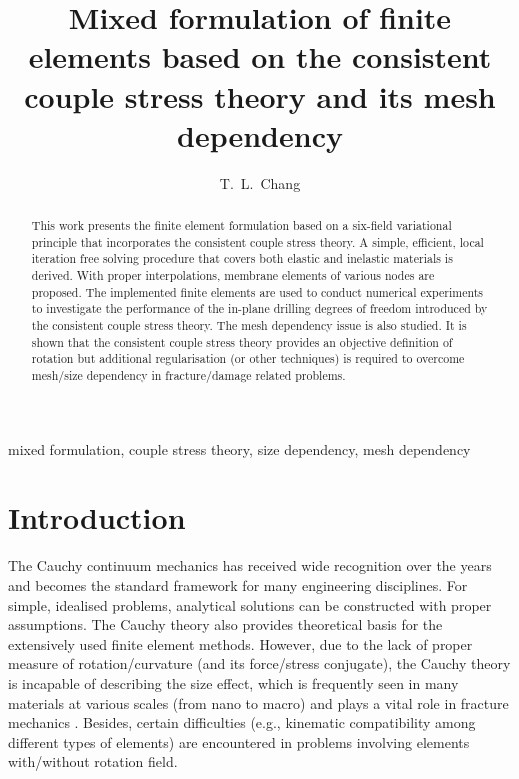 \documentclass[3p,sort&compress,11pt,fleqn]{elsarticle}
\begin{document}
\begin{abstract}
This work presents the finite element formulation based on a six-field variational principle that incorporates the consistent couple stress theory. A simple, efficient, local iteration free solving procedure that covers both elastic and inelastic materials is derived. With proper interpolations, membrane elements of various nodes are proposed. The implemented finite elements are used to conduct numerical experiments to investigate the performance of the in-plane drilling degrees of freedom introduced by the consistent couple stress theory. The mesh dependency issue is also studied. It is shown that the consistent couple stress theory provides an objective definition of rotation but additional regularisation (or other techniques) is required to overcome mesh/size dependency in fracture/damage related problems.
\end{abstract}
\begin{keyword}
mixed formulation\sep
couple stress theory\sep
size dependency\sep
mesh dependency
\end{keyword}
\begin{frontmatter}
\title{Mixed formulation of finite elements based on the consistent couple stress theory and its mesh dependency}
\author[]{T.~L.~Chang}
\address{Department of Civil and Natural Resources Engineering, University of Canterbury, Christchurch, New Zealand, 8041.}
\end{frontmatter}
\section{Introduction}
The Cauchy continuum mechanics has received wide recognition over the years and becomes the standard framework for many engineering disciplines. For simple, idealised problems, analytical solutions can be constructed \citep[see, e.g.,][]{Timoshenko2010} with proper assumptions. The Cauchy theory also provides theoretical basis for the extensively used finite element methods. However, due to the lack of proper measure of rotation/curvature (and its force/stress conjugate), the Cauchy theory is incapable of describing the size effect, which is frequently seen in many materials at various scales (from nano to macro) and plays a vital role in fracture mechanics \citep{Bazant1984}. Besides, certain difficulties (e.g., kinematic compatibility among different types of elements) are encountered in problems involving elements with/without rotation field.
\end{document}
